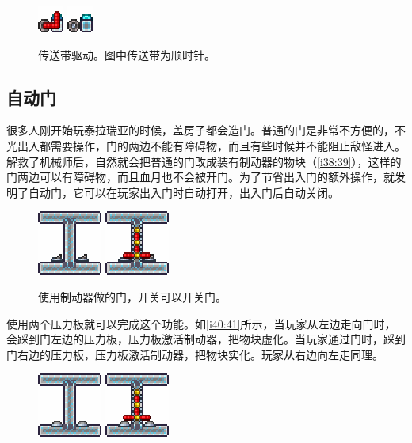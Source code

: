 \begin{figure}[!ht]
\begin{center}
\includegraphics{images/5.png}
\qquad
\includegraphics{images/6.png}
\end{center}
\caption{传送带驱动。图中传送带为顺时针。}
\label{i5:6}
\end{figure}

\subsection{自动门}

很多人刚开始玩泰拉瑞亚的时候，盖房子都会造门。普通的门是非常不方便的，不光出入都需要操作，门的两边不能有障碍物，而且有些时候并不能阻止敌怪进入。解救了机械师后，自然就会把普通的门改成装有制动器的物块（\autoref{i38:39}），这样的门两边可以有障碍物，而且血月也不会被开门。为了节省出入门的额外操作，就发明了自动门，它可以在玩家出入门时自动打开，出入门后自动关闭。

\begin{figure}[!ht]
\begin{center}
\includegraphics{images/38.png}
\qquad
\includegraphics{images/39.png}
\end{center}
\caption{使用制动器做的门，开关可以开关门。}
\label{i38:39}
\end{figure}

使用两个压力板就可以完成这个功能。如\autoref{i40:41}所示，当玩家从左边走向门时，会踩到门左边的压力板，压力板激活制动器，把物块虚化。当玩家通过门时，踩到门右边的压力板，压力板激活制动器，把物块实化。玩家从右边向左走同理。

\begin{figure}[!ht]
\begin{center}
\includegraphics{images/40.png}
\qquad
\includegraphics{images/41.png}
\end{center}
\caption{}
\label{i40:41}
\end{figure}

